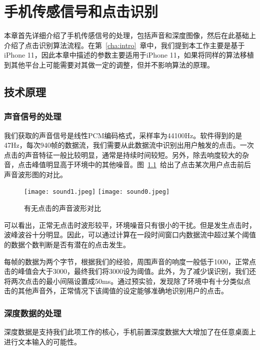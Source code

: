 \chapter{手机传感信号和点击识别}
\label{cha:sensing} %
本章首先详细介绍了手机传感信号的处理，包括声音和深度图像，然后在此基础上介绍了点击识别算法流程。在第~\ref{cha:intro}~章中，我们提到本工作主要是基于iPhone 11，因此本章中描述的参数主要适用于iPhone 11，如果将同样的算法移植到其他平台上可能需要对其做一定的调整，但并不影响算法的原理。

\section{技术原理}
\subsection{声音信号的处理}
我们获取的声音信号是线性PCM编码格式，采样率为44100Hz。软件得到的是47Hz，每次940帧的数据流，我们需要从此数据流中识别出用户触发的点击。一次点击的声音特征一般比较明显，通常是持续时间较短。另外，除去响度较大的杂音，点击峰值明显高于环境中的其他噪音。图~\ref{fig:sound-comp}~给出了点击某次用户点击前后声音波形图的对比。

\begin{figure}[h]
  \centering%
    {\texttt{[image: sound1.jpeg]}}%
  \hspace{4em}%
      {\texttt{[image: sound0.jpeg]}}
  \caption{有无点击的声音波形对比}
  \label{fig:sound-comp}
\end{figure}

可以看出，正常无点击时波形较平，环境噪音只有很小的干扰。但是发生点击时，波峰波谷十分明显。因此，可以通过计算在一段时间窗口内数据流中超过某个阈值的数据个数判断是否有潜在的点击发生。

每帧的数据为两个字节，根据我们的经验，周围声音的响度一般低于1000，正常点击的峰值会大于3000，最终我们将3000设为阈值。此外，为了减少误识别，我们还将两次点击的最小间隔设置成50ms。通过预实验，发现除了环境中有十分类似点击的其他声音外，正常情况下该阈值的设定能够准确地识别用户的点击。

\subsection{深度数据的处理}
深度数据是支持我们此项工作的核心，手机前置深度数据大大增加了在任意桌面上进行文本输入的可能性。

